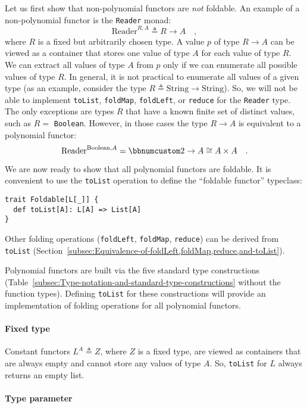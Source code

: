 Let us first show that non-polynomial functors are \emph{not} foldable.
An example of a non-polynomial functor is the \lstinline!Reader!
monad:
\[
\text{Reader}^{R,A}\triangleq R\rightarrow A\quad,
\]
where $R$ is a fixed but arbitrarily chosen type. A value $p$ of
type $R\rightarrow A$ can be viewed as a container that stores one
value of type $A$ for each value of type $R$. We can extract all
values of type $A$ from $p$ only if we can enumerate all possible
values of type $R$. In general, it is not practical to enumerate
all values of a given type (as an example, consider the type $R\triangleq\text{String}\rightarrow\text{String}$).
So, we will not be able to implement \lstinline!toList!, \lstinline!foldMap!,
\lstinline!foldLeft!, or \lstinline!reduce! for the \lstinline!Reader!
type. The only exceptions are types $R$ that have a known finite
set of distinct values, such as $R=$ \lstinline!Boolean!. However,
in those cases the type $R\rightarrow A$ is equivalent to a polynomial
functor:
\[
\text{Reader}^{\text{Boolean},A}=\bbnum 2\rightarrow A\cong A\times A\quad.
\]

We are now ready to show that all polynomial functors are foldable.
It is convenient to use the \lstinline!toList! operation to define
the \textsf{``}foldable functor\textsf{''} typeclass:
\begin{lstlisting}
trait Foldable[L[_]] {
  def toList[A]: L[A] => List[A]
}
\end{lstlisting}
Other folding operations (\lstinline!foldLeft!, \lstinline!foldMap!,
\lstinline!reduce!) can be derived from \lstinline!toList! (Section~\ref{subsec:Equivalence-of-foldLeft,foldMap,reduce,and-toList}).

Polynomial functors are built via the five standard type constructions
(Table~\ref{subsec:Type-notation-and-standard-type-constructions}
without the function types). Defining \lstinline!toList! for these
constructions will provide an implementation of folding operations
for all polynomial functors.

\paragraph{Fixed type}

Constant functors $L^{A}\triangleq Z$, where $Z$ is a fixed type,
are viewed as containers that are always empty and cannot store any
values of type $A$. So, \lstinline!toList! for $L$ always returns
an empty list.

\paragraph{Type parameter}

